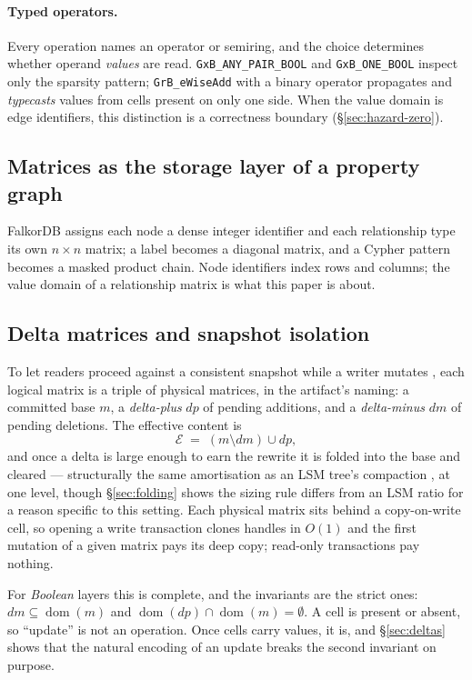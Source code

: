 \documentclass[11pt,a4paper]{article}
\theoremstyle{plain}
\theoremstyle{definition}
\theoremstyle{remark}
\newcommand{\dom}{\operatorname{dom}}
\begin{document}
\paragraph{Typed operators.}
Every operation names an operator or semiring, and the choice determines
whether operand \emph{values} are read. \texttt{GxB\_ANY\_PAIR\_BOOL} and
\texttt{GxB\_ONE\_BOOL} inspect only the sparsity pattern;
\texttt{GrB\_eWiseAdd} with a binary operator propagates and \emph{typecasts}
values from cells present on only one side. When the value domain is edge
identifiers, this distinction is a correctness boundary
(\S\ref{sec:hazard-zero}).

\subsection{Matrices as the storage layer of a property graph}

FalkorDB assigns each node a dense integer identifier and each relationship
type its own $n \times n$ matrix; a label becomes a diagonal matrix, and a
Cypher pattern becomes a masked product chain. Node identifiers index rows
and columns; the value domain of a relationship matrix is what this paper is
about.

\subsection{Delta matrices and snapshot isolation}
\label{sec:bg-delta}

To let readers proceed against a consistent snapshot while a writer mutates
\cite{bernstein1983mvcc,neumann2015mvcc}, each logical matrix is a triple of
physical matrices, in the artifact's naming: a committed base $m$, a
\emph{delta-plus} $dp$ of pending additions, and a \emph{delta-minus} $dm$ of
pending deletions. The effective content is
\[
  \mathcal{E} \;=\; (m \setminus dm) \cup dp ,
\]
and once a delta is large enough to earn the rewrite it is folded into the base
and cleared --- structurally the same amortisation as an LSM tree's compaction
\cite{oneil1996lsm}, at one level, though \S\ref{sec:folding} shows the sizing
rule differs from an LSM ratio for a reason specific to this setting. Each
physical matrix sits behind
a copy-on-write cell, so opening a write transaction clones handles in $O(1)$
and the first mutation of a given matrix pays its deep copy; read-only
transactions pay nothing.

For \emph{Boolean} layers this is complete, and the invariants are the strict
ones: $dm \subseteq \dom(m)$ and $\dom(dp) \cap \dom(m) = \emptyset$. A cell
is present or absent, so ``update'' is not an operation. Once cells carry
values, it is, and \S\ref{sec:deltas} shows that the natural encoding of an
update breaks the second invariant on purpose.
\end{document}
